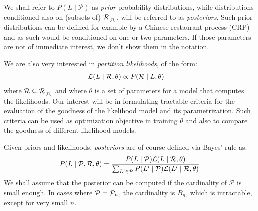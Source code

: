 \documentclass[a4paper,oneside,12pt,english]{article}
\def\Lset{\mathcal{L}}
\def\Pset{\mathcal{P}}
\begin{document}
We shall refer to $P(L\mid\Pset)$ as \emph{prior} probability distributions, while distributions conditioned also on (subsets of) $\mathcal{R}_{[n]}$, will be referred to as \emph{posteriors}. Such prior distributions can be defined for example by a Chinese restaurant process (CRP) and as such would be conditioned on one or two parameters. If those parameters are not of immediate interest, we don't show them in the notation.

We are also very interested in \emph{partition likelihoods}, of the form:
\begin{align}
\Lset(L\mid\Rset,\theta) &\propto P(\Rset\mid L,\theta)
\end{align}
where $\mathcal{R}\subseteq\mathcal{R}_{[n]}$ and where $\theta$ is a set of parameters for a model that computes the likelihoods. Our interest will be in formulating tractable criteria for the evaluation of the goodness of the likelihood model and its parametrization. Such criteria can be used as optimization objective in training $\theta$ and also to compare the goodness of different likelihood models.

Given priors and likelihoods, \emph{posteriors} are of course defined via Bayes' rule as:
\begin{align}
P(L\mid\Pset,\Rset,\theta) = \frac{P(L\mid\Pset) \Lset(L\mid\Rset,\theta)}{\sum_{L'\in\Pset} P(L'\mid\Pset) \Lset(L'\mid\Rset,\theta)}
\end{align} 
We shall assume that the posterior can be computed if the cardinality of $\Pset$ is small enough. In cases where $\Pset=\Pn$, the cardinality is $B_n$, which is intractable, except for very small $n$.





%
%
\end{document}
